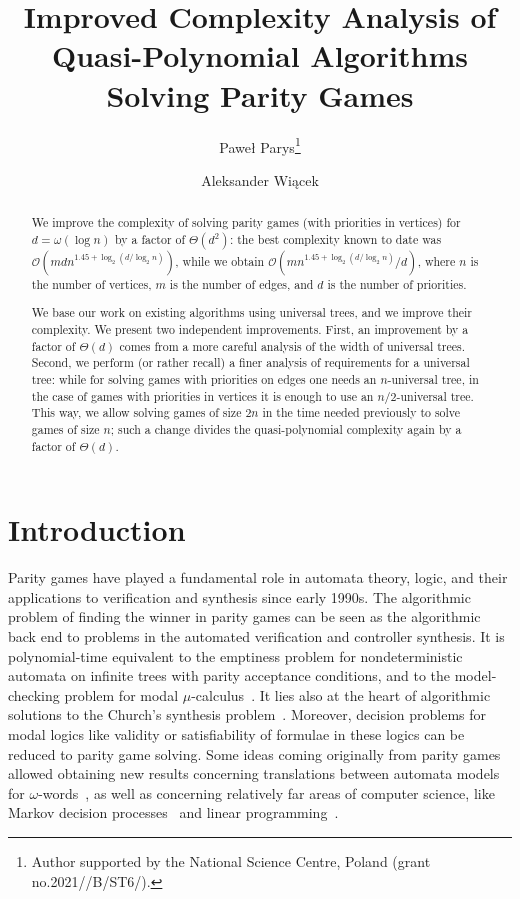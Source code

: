\documentclass[envcountsect,envcountsame]{llncs}
\title{Improved Complexity Analysis of Quasi-Polynomial Algorithms Solving Parity Games}
\author{Paweł Parys\orcidID{0000-0001-7247-1408}\thanks{Author supported by the National Science Centre, Poland (grant no.\@ 2021/\allowbreak 41/\allowbreak B/\allowbreak ST6/\allowbreak 03914).} \and
	Aleksander Wiącek}
\institute{Institute of Informatics, University of Warsaw, Poland}
\newcommand{\Oo}{\mathcal{O}}
\begin{document}
\maketitle

\begin{abstract}
	We improve the complexity of solving parity games (with priorities in vertices) for $d=\omega(\log n)$ by a factor of $\Theta(d^2)$:
	the best complexity known to date was $\Oo(mdn^{1{.}45+\log_2(d/\log_2 n)})$,
	while we obtain $\Oo(mn^{1{.}45+\log_2(d/\log_2 n)}/d)$,
	where $n$ is the number of vertices, $m$ is the number of edges, and $d$ is the number of priorities.

	We base our work on existing algorithms using universal trees, and we improve their complexity.
	We present two independent improvements.
	First, an improvement by a factor of $\Theta(d)$ comes from a more careful analysis of the width of universal trees.
	Second, we perform (or rather recall) a finer analysis of requirements for a universal tree:
	while for solving games with priorities on edges one needs an $n$-universal tree,
	in the case of games with priorities in vertices it is enough to use an $n/2$-universal tree.
	This way, we allow solving games of size $2n$ in the time needed previously to solve games of size $n$;
	such a change divides the quasi-polynomial complexity again by a factor of $\Theta(d)$.

\end{abstract}

\section{Introduction}

	Parity games have played a fundamental role in automata theory, logic, and their applications to verification and synthesis since early 1990s.
	The algorithmic problem of finding the winner in parity games can be seen as the algorithmic back end to problems in the automated verification and controller synthesis.
	It is polynomial-time equivalent to the emptiness problem for nondeterministic automata on infinite trees with parity acceptance conditions, and to the model-checking problem for modal $\mu$-calculus~\cite{EJS01}.
	It lies also at the heart of algorithmic solutions to the Church’s synthesis problem~\cite{RabinBook}.
	Moreover, decision problems for modal logics like validity or satisfiability of formulae in these logics can be reduced to parity game solving.
	Some ideas coming originally from parity games allowed obtaining new results concerning translations between automata models for $\omega$-words~\cite{parity2AWA,parity2AWA-univ},
	as well as concerning relatively far areas of computer science, like Markov decision processes~\cite{FearnleyMDP} and linear programming~\cite{FHZ-simplex,Friedmann-Zadeh}.
\end{document}
